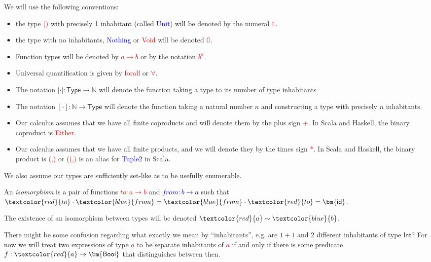 \documentclass[tikz]{beamer}
\newcommand{\cat}[1]{\bm{ \mathsf{#1} }}
\newcommand{\zero}{\bm{\mathbb{0}}}
\newcommand{\one}{\bm{\mathbb{1}}}
\newcommand{\red}[1]{\textcolor{red}{#1}}
\newcommand{\mred}[1]{\textcolor{red}{$#1$}}
\newcommand{\blue}[1]{\textcolor{blue}{#1}}
\newcommand{\mblue}[1]{\textcolor{blue}{$#1$}}
\theoremstyle{definition}
\begin{document}
\frame
{ 
	We will use the following conventions: 
	
	\begin{itemize}
		\item the type \red{()} with precisely 1 inhabitant (called \blue{Unit}) will be denoted by the numeral  \mred{\one}. 
		\item the type with no inhabitants, \blue{Nothing} or \red{Void} will be denoted \mred{\zero}. 
		\item Function types will be denoted by \red{$a \to b$} or by the notation \red{$b^a$}. 
		\item Universal quantification is given by \red{forall} or \red{$\forall$}.
		\item The notation $|\cdot| : \cat{Type} \to \mathbb{N}$ will denote the function taking a type to its number of type inhabitants
		\item The notation $[\cdot] : \mathbb{N} \to \cat{Type} $ will denote the function taking a natural number $n$ and constructing a type with precisely $n$ inhabitants. 
	\end{itemize}
}

\frame
{
	\begin{itemize}
		\item Our calculus assumes that we have all finite coproducts and will denote them by the plus sign \red{+}. In Scala and Haskell, the binary coproduct is \red{Either}.
		\item Our calculus assumes that we have all finite products, and we will denote they by the times sign \red{*}. In Scala and Haskell, the binary product is \red{(,)} or (\red{(,)} is an alias for \blue{Tuple2} in Scala.
	\end{itemize}
}


\frame
{
	We also assume our types are sufficiently set-like as to be usefully enumerable. 
}

\frame
{
	
	\begin{definition}[Isomorphism]
	
		An \textit{isomorphism} is a pair of functions \mred{to : a \to b} and \mblue{from : b \to a} such that $\red{to} \cdot \blue{from} = \blue{from} \cdot \red{to} = \cat{id}$. 
		
		The existence of an isomorphism between types will be denoted $\red{a}  \sim \blue{b}$. 
		
	\end{definition}
}


\frame
{
	There might be some confusion regarding what exactly we mean by “inhabitants”, e.g. are $1 + 1$ and $2$ different inhabitants of type $\cat{Int}$? For now we will treat two expressions of type \mred{a} to be separate inhabitants of \mred{a} if and only if there is some predicate $f : \red{a} \to \cat{Bool}$ that distinguishes between then. 
}
\end{document}
